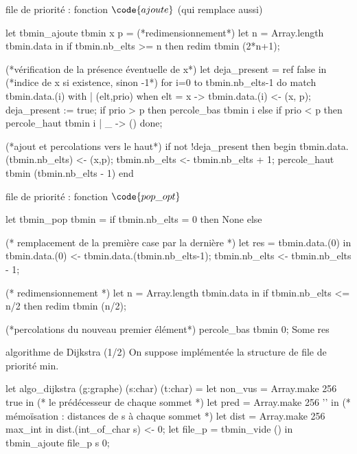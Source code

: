 \begin{adjustwidth}{-3cm}{-3cm}
\begin{implementation}{file de priorité : fonction $\code{ajoute}$ (qui remplace aussi)}
    \begin{lstOCaml}
    let tbmin_ajoute tbmin x p  =
        (*redimensionnement*)
        let n = Array.length tbmin.data in
        if tbmin.nb_elts >= n then 
            redim tbmin (2*n+1);
    
        (*vérification de la présence éventuelle de x*)
        let deja_present = ref false in (*indice de x si existence, sinon -1*)
        for i=0 to tbmin.nb_elts-1 do
            match tbmin.data.(i) with
            | (elt,prio) when elt = x -> 
                tbmin.data.(i) <- (x, p); 
                deja_present := true;
                if prio > p then 
                percole_bas tbmin i
                else if prio < p then
                percole_haut tbmin i
            | _ -> ()
        done;
    
        (*ajout et percolations vers le haut*)
        if not !deja_present then begin
            tbmin.data.(tbmin.nb_elts) <- (x,p);
            tbmin.nb_elts <- tbmin.nb_elts + 1;
            percole_haut tbmin (tbmin.nb_elts - 1)
        end
    \end{lstOCaml}
\end{implementation}

\begin{implementation}{file de priorité : fonction $\code{pop\_opt}$}
    \begin{lstOCaml}
    let tbmin_pop tbmin =
        if tbmin.nb_elts = 0 then None else
    
     (* remplacement de la première case par la dernière *)
        let res =  tbmin.data.(0) in 
        tbmin.data.(0) <- tbmin.data.(tbmin.nb_elts-1);
        tbmin.nb_elts <- tbmin.nb_elts - 1;
    
     (* redimensionnement *)
        let n = Array.length tbmin.data in
        if tbmin.nb_elts <= n/2 then 
            redim tbmin (n/2);
    
        (*percolations du nouveau premier élément*)
        percole_bas tbmin 0;
        Some res
    \end{lstOCaml}
\end{implementation}

\begin{implementation}{algorithme de Dijkstra (1/2)}
    On suppose implémentée la structure de file de priorité min.
    \begin{lstOCaml}
    let algo_dijkstra (g:graphe) (s:char) (t:char) =
        let non_vus = Array.make 256 true in
     (* le prédécesseur de chaque sommet *)
        let pred = Array.make 256 '' in 
     (* mémoïsation : distances de s à chaque sommet *)
        let dist = Array.make 256 max_int in 
        dist.(int_of_char s) <- 0;
        let file_p = tbmin_vide () in
        tbmin_ajoute file_p s 0;
    

\end{lstOCaml}
\end{implementation}
\end{adjustwidth}
